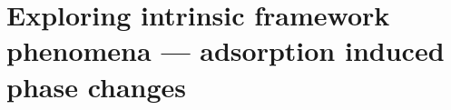 
\graphicspath{ {\thisch/figures/} }

\chapter{Exploring intrinsic framework phenomena %
--- adsorption induced phase changes}%
\label{dut}








